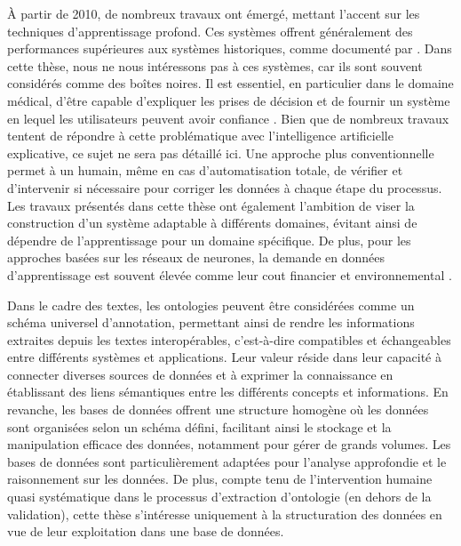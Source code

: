 À partir de 2010, de nombreux travaux ont émergé, mettant l'accent sur les techniques d'apprentissage profond.
Ces systèmes offrent généralement des performances supérieures aux systèmes historiques, comme documenté par \cite{al-aswadiAutomaticOntologyConstruction2020}.
Dans cette thèse, nous ne nous intéressons pas à ces systèmes, car ils sont souvent considérés comme des boîtes noires.
Il est essentiel, en particulier dans le domaine médical, d'être capable d'expliquer les prises de décision et de fournir un système en lequel les utilisateurs peuvent avoir confiance \cite{ribeiroWhyShouldTrust2016}.
Bien que de nombreux travaux tentent de répondre à cette problématique avec l'intelligence artificielle explicative, ce sujet ne sera pas détaillé ici.
Une approche plus conventionnelle permet à un humain, même en cas d'automatisation totale, de vérifier et d'intervenir si nécessaire pour corriger les données à chaque étape du processus.
Les travaux présentés dans cette thèse ont également l'ambition de viser la construction d'un système adaptable à différents domaines, évitant ainsi de dépendre de l'apprentissage pour un domaine spécifique.
De plus, pour les approches basées sur les réseaux de neurones, la demande en données d'apprentissage est souvent élevée comme leur cout financier et environnemental \cite{strubellEnergyPolicyConsiderations2019}.

Dans le cadre des textes, les ontologies peuvent être considérées comme un schéma universel d'annotation, permettant ainsi de rendre les informations extraites depuis les textes interopérables, c'est-à-dire compatibles et échangeables entre différents systèmes et applications.
Leur valeur réside dans leur capacité à connecter diverses sources de données et à exprimer la connaissance en établissant des liens sémantiques entre les différents concepts et informations.
En revanche, les bases de données offrent une structure homogène où les données sont organisées selon un schéma défini, facilitant ainsi le stockage et la manipulation efficace des données, notamment pour gérer de grands volumes.
Les bases de données sont particulièrement adaptées pour l'analyse approfondie et le raisonnement sur les données.
De plus, compte tenu de l'intervention humaine quasi systématique dans le processus d'extraction d'ontologie (en dehors de la validation), cette thèse s'intéresse uniquement à la structuration des données en vue de leur exploitation dans une base de données.

